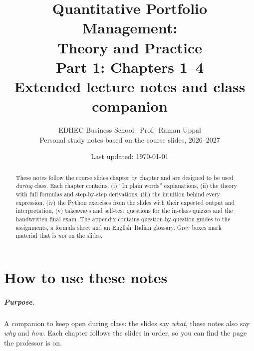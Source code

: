 \documentclass[11pt,a4paper]{report}
\title{\textbf{Quantitative Portfolio Management:\\Theory and Practice}\\[6pt]
\Large Part 1: Chapters 1--4\\[4pt]
\large Extended lecture notes and class companion}
\author{EDHEC Business School \textbullet\ Prof.\ Raman Uppal\\[4pt]
\small Personal study notes based on the course slides, 2026--2027}
\date{Last updated: \today}
\begin{document}
\maketitle

\begin{abstract}
\noindent These notes follow the course slides chapter by chapter and are
designed to be used \emph{during} class. Each chapter contains: (i) ``In plain
words'' explanations, (ii) the theory with full formulas and step-by-step
derivations, (iii) the intuition behind every expression, (iv) the Python
exercises from the slides with their expected output and interpretation, (v)
takeaways and self-test questions for the in-class quizzes and the handwritten
final exam. The appendix contains question-by-question guides to the
assignments, a formula sheet and an English--Italian glossary. Grey boxes mark
material that is \emph{not} on the slides.
\end{abstract}

\tableofcontents

\chapter*{How to use these notes}

\paragraph{Purpose.} A companion to keep open during class: the slides say
\emph{what}, these notes also say \emph{why} and \emph{how}. Each chapter
follows the slides in order, so you can find the page the professor is on.
\end{document}
